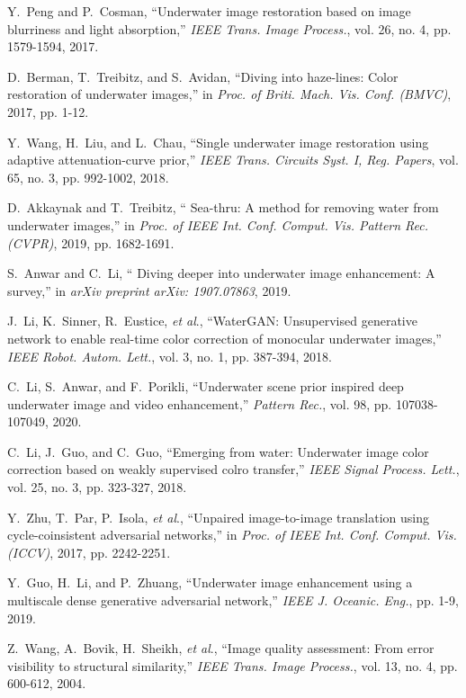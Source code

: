 \documentclass[journal]{IEEEtran}
\newcommand{\etal}{\textit{et al}.}
\begin{document}
\begin{thebibliography}{20}
Y.~Peng and P.~Cosman, ``Underwater image restoration based on image blurriness and light absorption,'' \emph{IEEE Trans. Image Process.}, vol. 26, no. 4, pp. 1579-1594, 2017.

D.~Berman, T.~Treibitz, and S.~Avidan, ``Diving into haze-lines: Color restoration of underwater images,'' in \emph{Proc. of Briti. Mach. Vis. Conf. (BMVC)}, 2017, pp. 1-12.

Y.~Wang, H.~Liu, and L.~Chau, ``Single underwater image restoration using adaptive attenuation-curve prior,'' \emph{IEEE Trans. Circuits Syst. I, Reg. Papers}, vol. 65, no. 3, pp. 992-1002, 2018.

D.~Akkaynak and T.~Treibitz, `` Sea-thru: A method for removing water from underwater images,'' in \emph{Proc. of IEEE Int. Conf. Comput. Vis. Pattern Rec. (CVPR)}, 2019, pp. 1682-1691.

S.~Anwar and C.~Li, `` Diving deeper into underwater image enhancement: A survey,'' in \emph{arXiv preprint arXiv: 1907.07863}, 2019.

J.~Li, K.~Sinner, R.~Eustice, \etal, ``WaterGAN: Unsupervised generative network to enable real-time color correction of monocular underwater images,'' \emph{IEEE Robot. Autom. Lett.}, vol. 3, no. 1, pp. 387-394, 2018.

C.~Li, S.~Anwar, and F.~Porikli, ``Underwater scene prior inspired deep underwater image and video enhancement,'' \emph{Pattern Rec.}, vol. 98, pp. 107038-107049, 2020.

C.~Li, J.~Guo, and C.~Guo, ``Emerging from water: Underwater image color correction based on weakly supervised colro transfer,'' \emph{IEEE Signal Process. Lett.}, vol. 25, no. 3, pp. 323-327, 2018.

Y.~Zhu, T.~Par, P.~Isola, \etal,  ``Unpaired image-to-image translation using cycle-coinsistent adversarial networks,'' in \emph{Proc. of IEEE Int. Conf. Comput. Vis.(ICCV)}, 2017, pp. 2242-2251.



Y.~Guo, H.~Li, and P.~Zhuang, ``Underwater image enhancement using a multiscale dense generative adversarial network,'' \emph{IEEE J. Oceanic. Eng.}, pp. 1-9, 2019.

Z.~Wang, A.~Bovik, H.~Sheikh, \etal, ``Image quality assessment: From error visibility to structural similarity,'' \emph{IEEE Trans. Image Process.}, vol. 13, no. 4, pp. 600-612, 2004.



\end{thebibliography}
\end{document}
